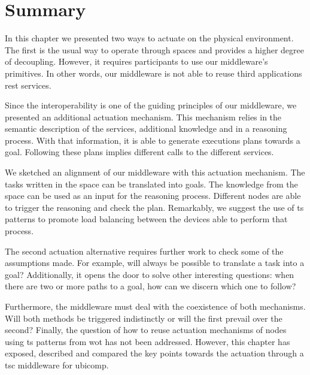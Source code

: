 \section{Summary}

In this chapter we presented two ways to actuate on the physical environment.
The first is the usual way to operate through spaces and provides a higher degree of decoupling.
However, it requires participants to use our middleware's primitives. %
In other words, our middleware is not able to reuse third applications \ac{rest} services.


Since the interoperability is one of the guiding principles of our middleware, we presented an additional actuation mechanism.
This mechanism relies in the semantic description of the services, additional knowledge and in a reasoning process. %
With that information, it is able to generate executions plans towards a goal.
Following these plans implies different calls to the different services.


We sketched an alignment of our middleware with this actuation mechanism.
The tasks written in the space can be translated into goals.
The knowledge from the space can be used as an input for the reasoning process.
Different nodes are able to trigger the reasoning and check the plan.
Remarkably, we suggest the use of \ac{ts} patterns to promote load balancing between the devices able to perform that process.


The second actuation alternative requires further work to check some of the assumptions made.
For example, will always be possible to translate a task into a goal?
Additionally, it opens the door to solve other interesting questions: when there are two or more paths to a goal, how can we discern which one to follow?


Furthermore, the middleware must deal with the coexistence of both mechanisms.
Will both methods be triggered indistinctly or will the first prevail over the second?
Finally, the question of how to reuse actuation mechanisms of nodes using \ac{ts} patterns from \ac{wot} has not been addressed.
However, this chapter has exposed, described and compared the key points towards the actuation through a \ac{tsc} middleware for \ac{ubicomp}.